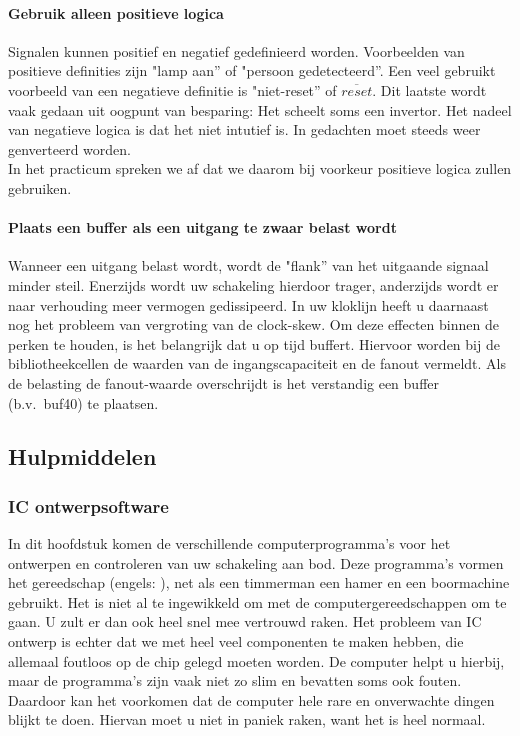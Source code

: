 \paragraph{Gebruik alleen positieve logica}
Signalen kunnen positief en negatief gedefinieerd worden.
Voorbeelden van positieve definities zijn "lamp aan'' of "persoon gedetecteerd''.
Een veel gebruikt voorbeeld van een negatieve definitie is "niet-reset'' of $\overline{reset}$.
Dit laatste wordt vaak gedaan uit oogpunt van besparing: Het scheelt soms een invertor.
Het nadeel van negatieve logica is dat het niet intu{\ii}tief is.
In gedachten moet steeds weer ge{\ii}nverteerd worden.\\
In het practicum spreken we af dat we daarom bij voorkeur positieve logica zullen gebruiken. 

\paragraph{Plaats een buffer als een uitgang te zwaar belast wordt}
Wanneer een uitgang belast wordt, wordt de "flank'' van het uitgaande signaal minder steil.
Enerzijds wordt uw schakeling hierdoor trager, anderzijds wordt er naar verhouding meer vermogen gedissipeerd.
In uw kloklijn heeft u daarnaast nog het probleem van vergroting van de clock-skew.
Om deze effecten binnen de perken te houden, is het belangrijk dat u op tijd buffert.
Hiervoor worden bij de bibliotheekcellen de waarden van de ingangscapaciteit en de fanout vermeldt.
Als de belasting de fanout-waarde overschrijdt is het verstandig een buffer (b.v.\ buf40) te plaatsen.

\subsection{Hulpmiddelen}
\subsubsection{IC ontwerpsoftware}
In dit hoofdstuk komen 
de verschillende computerprogramma's voor het ontwerpen
en controleren van uw schakeling aan bod. 
Deze programma's
vormen het gereedschap (engels: ), net als een timmerman een
hamer en een boormachine gebruikt. Het is niet al te ingewikkeld om met
de computergereedschappen om te gaan. U zult er dan ook heel snel
mee vertrouwd raken. 
Het probleem van IC ontwerp is echter dat we
met heel veel componenten te maken hebben, die allemaal foutloos op
de chip gelegd moeten worden. De computer helpt u hierbij, maar 
de programma's zijn vaak niet zo slim en bevatten soms ook fouten.
Daardoor kan het voorkomen dat de computer hele rare en onverwachte 
dingen blijkt te doen. Hiervan moet u niet in paniek raken, want het is
heel normaal.

